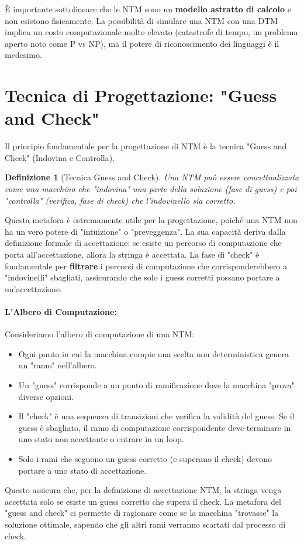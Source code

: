 \documentclass[a4paper]{article}
\newtheorem{definition}{Definizione}[section]
\begin{document}
È importante sottolineare che le NTM sono un \textbf{modello astratto di calcolo} e non esistono fisicamente. La possibilità di simulare una NTM con una DTM implica un costo computazionale molto elevato (catastrofe di tempo, un problema aperto noto come P vs NP), ma il potere di riconoscimento dei linguaggi è il medesimo.

\section{Tecnica di Progettazione: "Guess and Check"}

Il principio fondamentale per la progettazione di NTM è la tecnica "Guess and Check" (Indovina e Controlla).

\begin{definition}[Tecnica Guess and Check]
Una NTM può essere concettualizzata come una macchina che "indovina" una parte della soluzione (fase di \emph{guess}) e poi "controlla" (verifica, fase di \emph{check}) che l'indovinello sia corretto.
\end{definition}

Questa metafora è estremamente utile per la progettazione, poiché una NTM non ha un vero potere di "intuizione" o "preveggenza". La sua capacità deriva dalla definizione formale di accettazione: se esiste un percorso di computazione che porta all'accettazione, allora la stringa è accettata. La fase di "check" è fondamentale per \textbf{filtrare} i percorsi di computazione che corrisponderebbero a "indovinelli" sbagliati, assicurando che solo i guess corretti possano portare a un'accettazione.

\paragraph{L'Albero di Computazione:}
Consideriamo l'albero di computazione di una NTM:
\begin{itemize}
    \item Ogni punto in cui la macchina compie una scelta non deterministica genera un "ramo" nell'albero.
    \item Un "guess" corrisponde a un punto di ramificazione dove la macchina "prova" diverse opzioni.
    \item Il "check" è una sequenza di transizioni che verifica la validità del guess. Se il guess è sbagliato, il ramo di computazione corrispondente deve terminare in uno stato non accettante o entrare in un loop.
    \item Solo i rami che seguono un guess corretto (e superano il check) devono portare a uno stato di accettazione.
\end{itemize}
Questo assicura che, per la definizione di accettazione NTM, la stringa venga accettata solo se esiste un guess corretto che supera il check. La metafora del "guess and check" ci permette di ragionare come se la macchina "trovasse" la soluzione ottimale, sapendo che gli altri rami verranno scartati dal processo di check.
\end{document}
